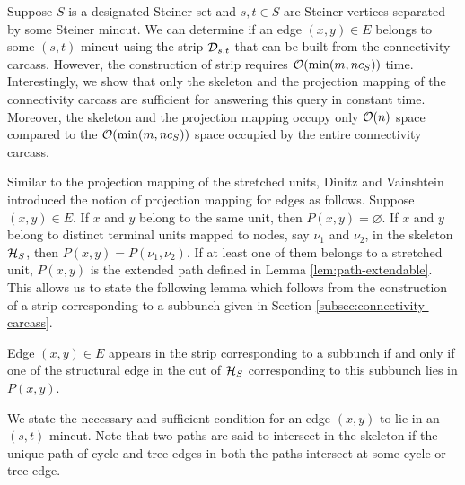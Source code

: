 Suppose $S$ is a designated Steiner set and $s,t\in S$ are Steiner vertices separated by some Steiner mincut. We can determine if an edge $(x,y)\in E$ belongs to some $(s,t)$-mincut using the strip ${\cal D}_{s,t}$ that can be built from the connectivity carcass. However, the construction of strip requires ${\cal O}(\min(m,nc_S))$ time. Interestingly, we show that only the skeleton and the projection mapping of the connectivity carcass are sufficient for answering this query in constant time. Moreover, the skeleton and the projection mapping occupy only ${\cal O}(n)$ space compared to the ${\cal O}(\min(m,nc_S))$ space occupied by the entire connectivity carcass.


Similar to the projection mapping of the stretched units, Dinitz and Vainshtein \cite{DBLP:journals/siamcomp/DinitzV00} introduced the notion of projection mapping for edges as follows. Suppose $(x,y)\in E$. If $x$ and $y$ belong to the same unit, then $P(x,y) = \varnothing$. If $x$ and $y$ belong to distinct terminal units mapped to nodes, say $\nu_1$ and $\nu_2$, in the skeleton ${\cal H}_S$, then $P(x,y) = P(\nu_1,\nu_2)$. If at least one of them belongs to a stretched unit, $P(x,y)$ is the extended path defined in Lemma \ref{lem:path-extendable}. This allows us to state the following lemma which follows from the construction of a strip corresponding to a subbunch given in Section \ref{subsec:connectivity-carcass}.

\begin{lemma}
Edge $(x,y)\in E$ appears in the strip corresponding to a subbunch if and only if one of the structural edge in the cut of ${\cal H}_S$ corresponding to this subbunch lies in $P(x,y)$.
\label{lem:edge-path-intersect-subbunch}
\end{lemma}

We state the necessary and sufficient condition for an edge $(x,y)$ to lie in an $(s,t)$-mincut. Note that two paths are said to intersect in the skeleton if the unique path of cycle and tree edges in both the paths intersect at some cycle or tree edge.


